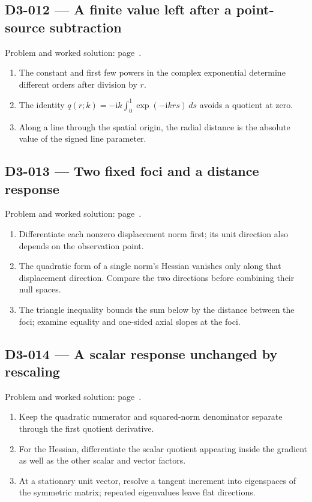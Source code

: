 \documentclass[11pt,oneside,openany]{book}
\begin{document}
\subsection*{D3-012 --- A finite value left after a point-source subtraction}
\label{hints:D3-012}
Problem and worked solution: page~\pageref{problem:D3-012}.

\begin{enumerate}
\item The constant and first few powers in the complex exponential determine different orders after division by \(r\).
\item The identity \(q(r;k)=-\mathrm{i}k\int_0^1\exp(-\mathrm{i}krs)\,ds\) avoids a quotient at zero.
\item Along a line through the spatial origin, the radial distance is the absolute value of the signed line parameter.
\end{enumerate}
\subsection*{D3-013 --- Two fixed foci and a distance response}
\label{hints:D3-013}
Problem and worked solution: page~\pageref{problem:D3-013}.

\begin{enumerate}
\item Differentiate each nonzero displacement norm first; its unit direction also depends on the observation point.
\item The quadratic form of a single norm's Hessian vanishes only along that displacement direction. Compare the two directions before combining their null spaces.
\item The triangle inequality bounds the sum below by the distance between the foci; examine equality and one-sided axial slopes at the foci.
\end{enumerate}
\subsection*{D3-014 --- A scalar response unchanged by rescaling}
\label{hints:D3-014}
Problem and worked solution: page~\pageref{problem:D3-014}.

\begin{enumerate}
\item Keep the quadratic numerator and squared-norm denominator separate through the first quotient derivative.
\item For the Hessian, differentiate the scalar quotient appearing inside the gradient as well as the other scalar and vector factors.
\item At a stationary unit vector, resolve a tangent increment into eigenspaces of the symmetric matrix; repeated eigenvalues leave flat directions.
\end{enumerate}
\end{document}
